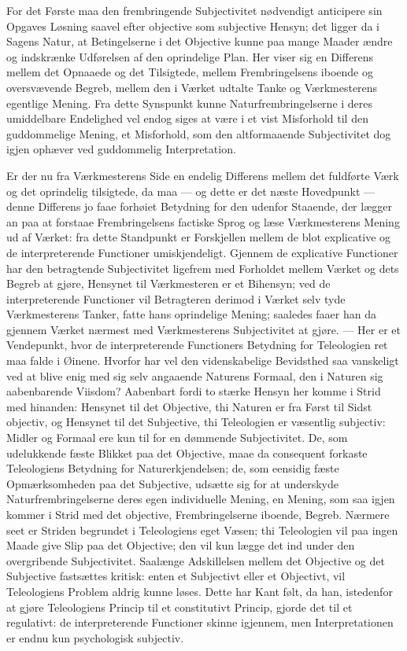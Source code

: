 \documentclass[12pt]{book}
\newcommand{\opage}[1]{\marginnote{\footnotesize\textit{[#1]}}}
\begin{document}
For det Første maa den frembringende Subjectivitet
nødvendigt anticipere sin Opgaves Løsning saavel efter objective
som subjective Hensyn; det ligger da i Sagens Natur,
at Betingelserne i det Objective kunne paa mange Maader
ændre og indskrænke Udførelsen af den oprindelige Plan.
Her viser sig en Differens mellem det Opnaaede og det Tilsigtede,
mellem Frembringelsens iboende og oversvævende Begreb,
mellem den i Værket udtalte Tanke og Værkmesterens
egentlige Mening. Fra dette Synspunkt kunne Naturfrembringelserne
i deres umiddelbare Endelighed vel endog siges
at være i et vist Misforhold til den guddommelige Mening,
et Misforhold, som den altformaaende Subjectivitet dog igjen
ophæver ved guddommelig Interpretation.

Er der nu fra Værkmesterens Side en endelig Differens
mellem det fuldførte Værk og det oprindelig tilsigtede, da
maa --- og dette er det næste Hovedpunkt --- denne Differens
jo faae forhøiet Betydning for den udenfor Staaende, der
lægger an paa at forstaae Frembringelsens factiske Sprog og
læse Værkmesterens Mening ud af Værket: fra dette Standpunkt
er Forskjellen mellem de blot explicative og de interpreterende
Functioner umiskjendeligt. Gjennem de explicative
Functioner har den betragtende Subjectivitet ligefrem med
Forholdet mellem Værket og dets Begreb at gjøre, Hensynet
til Værkmesteren er et Bihensyn; ved de interpreterende
Func\opage{173}tioner vil Betragteren derimod i Værket selv tyde Værkmesterens
Tanker, fatte hans oprindelige Mening; saaledes
faaer han da gjennem Værket nærmest med Værkmesterens
Subjectivitet at gjøre. --- Her er et Vendepunkt, hvor de
interpreterende Functioners Betydning for Teleologien ret maa
falde i Øinene. Hvorfor har vel den videnskabelige Bevidsthed
saa vanskeligt ved at blive enig med sig selv angaaende
Naturens Formaal, den i Naturen sig aabenbarende Viisdom?
Aabenbart fordi to stærke Hensyn her komme i Strid med
hinanden: Hensynet til det Objective, thi Naturen er fra
Først til Sidst objectiv, og Hensynet til det Subjective, thi
Teleologien er væsentlig subjectiv: Midler og Formaal ere
kun til for en dømmende Subjectivitet. De, som udelukkende
fæste Blikket paa det Objective, maae da consequent forkaste
Teleologiens Betydning for Naturerkjendelsen; de, som eensidig
fæste Opmærksomheden paa det Subjective, udsætte sig
for at underskyde Naturfrembringelserne deres egen individuelle
Mening, en Mening, som saa igjen kommer i Strid med det
objective, Frembringelserne iboende, Begreb. Nærmere seet er
Striden begrundet i Teleologiens eget Væsen; thi Teleologien
vil paa ingen Maade give Slip paa det Objective; den vil
kun lægge det ind under den overgribende Subjectivitet. Saalænge
Adskillelsen mellem det Objective og det Subjective fastsættes
kritisk: enten et Subjectivt eller et Objectivt, vil Teleologiens
Problem aldrig kunne løses. Dette har Kant følt,
da han, istedenfor at gjøre Teleologiens Princip til et constitutivt
Princip, gjorde det til et regulativt: de interpreterende
Functioner skinne igjennem, men Interpretationen er endnu
kun psychologisk subjectiv.
\end{document}
